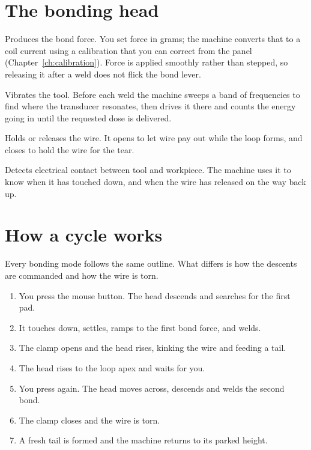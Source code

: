 \section{The bonding head}

\begin{description}[leftmargin=!,labelwidth=32mm,style=nextline,font=\normalfont\bfseries]

\item[Force coil] Produces the bond force. You set force in grams; the machine
  converts that to a coil current using a calibration that you can correct from
  the panel (Chapter~\ref{ch:calibration}). Force is applied smoothly rather
  than stepped, so releasing it after a weld does not flick the bond lever.

\item[Ultrasonic transducer] Vibrates the tool. Before each weld the machine
  sweeps a band of frequencies to find where the transducer resonates, then
  drives it there and counts the energy going in until the requested dose is
  delivered.

\item[Wire clamp] Holds or releases the wire. It opens to let wire pay out
  while the loop forms, and closes to hold the wire for the tear.

\item[Contact sensor] Detects electrical contact between tool and workpiece.
  The machine uses it to know when it has touched down, and when the wire has
  released on the way back up.

\end{description}


\section{How a cycle works}

Every bonding mode follows the same outline. What differs is how the descents
are commanded and how the wire is torn.

\begin{enumerate}[leftmargin=*]
\item You press the mouse button. The head descends and searches for the first
  pad.
\item It touches down, settles, ramps to the first bond force, and welds.
\item The clamp opens and the head rises, kinking the wire and feeding a tail.
\item The head rises to the loop apex and waits for you.
\item You press again. The head moves across, descends and welds the second
  bond.
\item The clamp closes and the wire is torn.
\item A fresh tail is formed and the machine returns to its parked height.
\end{enumerate}

